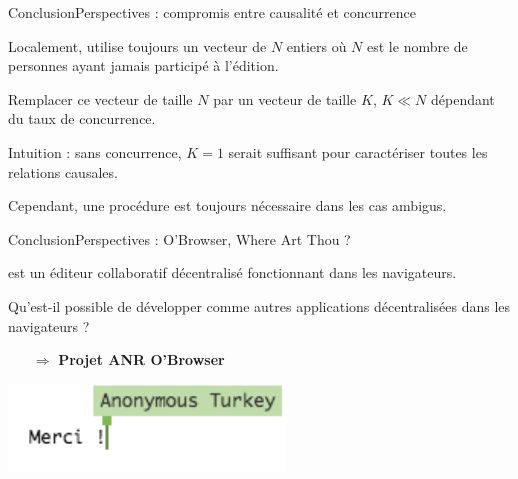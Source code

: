 \begin{frame}{Conclusion}{Perspectives : compromis entre causalité et concurrence}
  
  Localement, \CRATE utilise toujours un vecteur de $N$ entiers où $N$ est le
  nombre de personnes ayant jamais participé à l'édition.
  
  \vspace{0.5cm}

  Remplacer ce vecteur de taille $N$ par un vecteur de taille $K$, $K\ll N$
  dépendant du taux de concurrence.

  \vspace{0.5cm}

  Intuition : sans concurrence, $K=1$ serait suffisant pour caractériser toutes
  les relations causales.

  \vspace{0.5cm}

  Cependant, une procédure est toujours nécessaire dans les cas ambigus.

\end{frame}


\begin{frame}{Conclusion}{Perspectives : O'Browser, Where Art Thou ?}

  

  \CRATE est un éditeur collaboratif décentralisé fonctionnant dans les
  navigateurs.

  \vspace{0.25cm}

  Qu'est-il possible de développer comme autres applications décentralisées dans
  les navigateurs ?

  \vspace{0.25cm}
  

  \begin{center}
    
  \end{center}

  \vspace{0.25cm}
  
  \large
  \begin{itemize}
  \item [$\Rightarrow$] \textbf{Projet ANR O'Browser}
  \end{itemize}


\end{frame}


\begin{frame}
  
  \begin{center}
    \includegraphics[width=0.55\textwidth]{img/thanks.png}
  \end{center}

\end{frame}